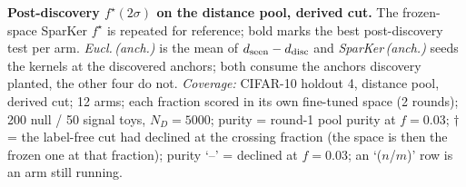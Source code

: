 \begin{table}[t]
\caption{\textbf{Post-discovery $f^\star(2\sigma)$ on the distance pool, derived cut.} The frozen-space SparKer $f^\star$ is repeated for reference; bold marks the best post-discovery test per arm. \emph{Eucl.\,(anch.)} is the mean of $d_{\rm seen}-d_{\rm disc}$ and \emph{SparKer\,(anch.)} seeds the kernels at the discovered anchors; both consume the anchors discovery planted, the other four do not. \emph{Coverage:} CIFAR-10 holdout 4, distance pool, derived cut; 12 arms; each fraction scored in its own fine-tuned space (2 rounds); 200 null / 50 signal toys, $N_D{=}5000$; purity = round-1 pool purity at $f{=}0.03$; $\dagger$ = the label-free cut had declined at the crossing fraction (the space is then the frozen one at that fraction); purity `--' = declined at $f{=}0.03$; an `($n$/$m$)' row is an arm still running.}
\label{tab:sigma_post_cifar10_h4_legal}
\end{table}
